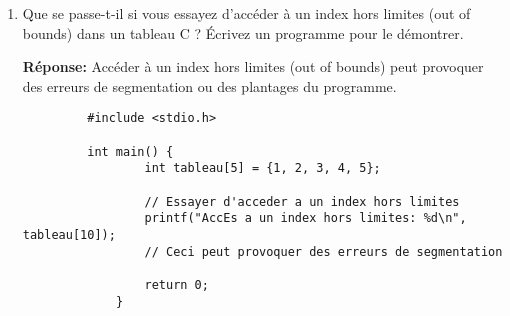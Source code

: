 \begin{enumerate}
	\item Que se passe-t-il si vous essayez d'accéder à un index hors limites (out of bounds) dans un tableau C ? Écrivez un programme pour le démontrer.
	
	 \textbf{Réponse:} Accéder à un index hors limites (out of bounds) peut provoquer des erreurs de segmentation ou des plantages du programme.
	 \begin{lstlisting}
		 #include <stdio.h>
		
		 int main() {
			     int tableau[5] = {1, 2, 3, 4, 5};
			
			     // Essayer d'acceder a un index hors limites
			     printf("AccEs a un index hors limites: %d\n", tableau[10]); 
			     // Ceci peut provoquer des erreurs de segmentation
			
			     return 0;
			 }
		 \end{lstlisting}
\end{enumerate}

